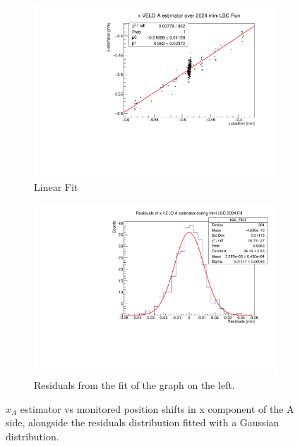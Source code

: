 \begin{figure}
    \centering
    \begin{subfigure}{0.48\textwidth}
    \includegraphics[width=\linewidth]{figures/xVeloA_fit_comparison.pdf}
    \caption{Linear Fit}\label{fig:xAfit_comparison}
    \end{subfigure}
    \begin{subfigure}{0.48\textwidth}
    \includegraphics[width=\linewidth]{figures/xVeloA_res_compariosn.pdf}
    \caption{Residuals from the fit of the graph on the left. }\label{fig:xAres_comparison}
    \end{subfigure}
    \caption{$\hat{x}_{A}$ estimator vs monitored position shifts in x component of the A side, alongside the residuals distribution fitted with a Gaussian distribution.}
    \label{fig:xA_comaprison}
\end{figure}
